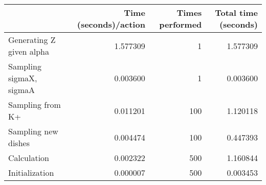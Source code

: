\begin{tabular}{lrrr}
\toprule
{} &  Time (seconds)/action &  Times performed &  Total time (seconds) \\
\midrule
Generating Z given alpha &               1.577309 &                1 &              1.577309 \\
Sampling sigmaX, sigmaA  &               0.003600 &                1 &              0.003600 \\
Sampling from K+         &               0.011201 &              100 &              1.120118 \\
Sampling new dishes      &               0.004474 &              100 &              0.447393 \\
Calculation              &               0.002322 &              500 &              1.160844 \\
Initialization           &               0.000007 &              500 &              0.003453 \\
\bottomrule
\end{tabular}
